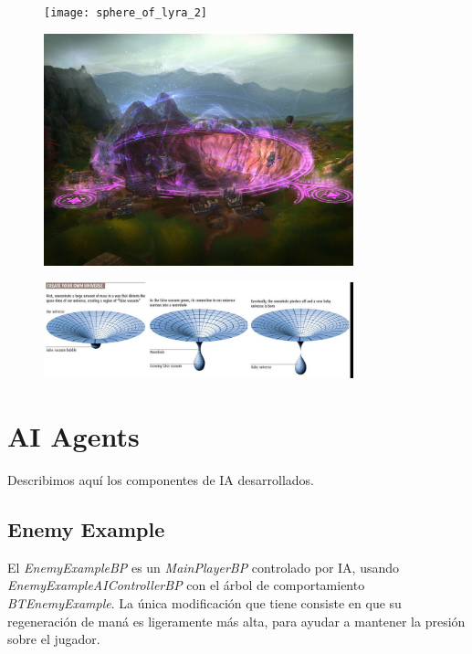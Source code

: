\documentclass[12pt]{report}
\begin{document}
\begin{figure}[h]
    \centering
    \texttt{[image: sphere\_of\_lyra\_2]}
\end{figure}

\begin{figure}[h]
    \centering
    \includegraphics[width=0.8\textwidth]{sphere_of_lyra_4}
\end{figure}

\begin{figure}[h]
    \centering
    \includegraphics[width=0.8\textwidth]{sphere_of_lyra_3}
\end{figure}

\section{AI Agents}

Describimos aquí los componentes de IA desarrollados.

\subsection{Enemy Example}

El \textit{\emph{EnemyExampleBP}} es un \textit{\emph{MainPlayerBP}} controlado por IA, usando \textit{\emph{EnemyExampleAIControllerBP}} con el árbol de comportamiento \textit{\emph{BTEnemyExample}}. La única modificación que tiene consiste en que su regeneración de maná es ligeramente más alta, para ayudar a mantener la presión sobre el jugador.
\end{document}
